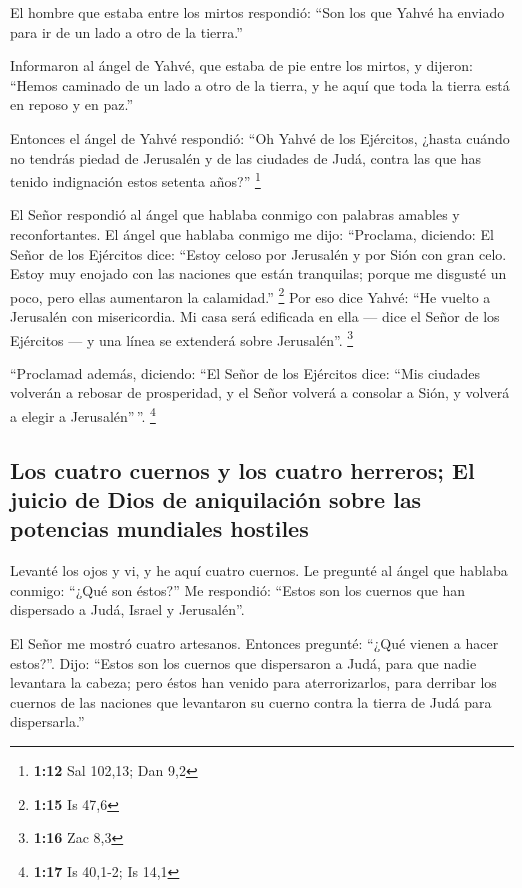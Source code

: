  El hombre que estaba entre los mirtos respondió: ``Son
los que Yahvé ha enviado para ir de un lado a otro de la tierra.''

 Informaron al ángel de Yahvé, que estaba de pie entre
los mirtos, y dijeron: ``Hemos caminado de un lado a otro de la tierra,
y he aquí que toda la tierra está en reposo y en paz.''

 Entonces el ángel de Yahvé respondió: ``Oh Yahvé de los
Ejércitos, ¿hasta cuándo no tendrás piedad de Jerusalén y de las
ciudades de Judá, contra las que has tenido indignación estos setenta
años?'' \footnote{\textbf{1:12} Sal 102,13; Dan 9,2}

 El Señor respondió al ángel que hablaba conmigo con
palabras amables y reconfortantes.  El ángel que hablaba
conmigo me dijo: ``Proclama, diciendo: El Señor de los Ejércitos dice:
``Estoy celoso por Jerusalén y por Sión con gran celo. 
Estoy muy enojado con las naciones que están tranquilas; porque me
disgusté un poco, pero ellas aumentaron la calamidad.'' \footnote{\textbf{1:15}
  Is 47,6}  Por eso dice Yahvé: ``He vuelto a Jerusalén
con misericordia. Mi casa será edificada en ella --- dice el Señor de
los Ejércitos --- y una línea se extenderá sobre Jerusalén''.
\footnote{\textbf{1:16} Zac 8,3}

 ``Proclamad además, diciendo: ``El Señor de los
Ejércitos dice: ``Mis ciudades volverán a rebosar de prosperidad, y el
Señor volverá a consolar a Sión, y volverá a elegir a Jerusalén''\,''.
\footnote{\textbf{1:17} Is 40,1-2; Is 14,1}

\hypertarget{los-cuatro-cuernos-y-los-cuatro-herreros-el-juicio-de-dios-de-aniquilaciuxf3n-sobre-las-potencias-mundiales-hostiles}{%
\subsection{Los cuatro cuernos y los cuatro herreros; El juicio de Dios
de aniquilación sobre las potencias mundiales
hostiles}\label{los-cuatro-cuernos-y-los-cuatro-herreros-el-juicio-de-dios-de-aniquilaciuxf3n-sobre-las-potencias-mundiales-hostiles}}

 Levanté los ojos y vi, y he aquí cuatro cuernos.
 Le pregunté al ángel que hablaba conmigo: ``¿Qué son
éstos?'' Me respondió: ``Estos son los cuernos que han dispersado a
Judá, Israel y Jerusalén''.

 El Señor me mostró cuatro artesanos. 
Entonces pregunté: ``¿Qué vienen a hacer estos?''. Dijo: ``Estos son los
cuernos que dispersaron a Judá, para que nadie levantara la cabeza; pero
éstos han venido para aterrorizarlos, para derribar los cuernos de las
naciones que levantaron su cuerno contra la tierra de Judá para
dispersarla.''

